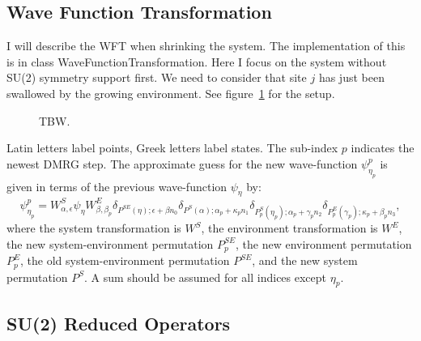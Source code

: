\documentclass[paper=letter]{scrartcl}
\newcommand{\cppClass}[1]{{\sffamily #1}}
\begin{document}
\subsection{Wave Function Transformation}
I will describe the WFT when shrinking the system. The implementation of this is 
in class \cppClass{WaveFunctionTransformation}. Here I focus on the system without SU(2) symmetry support first.
We need to consider that site $j$ has just been swallowed by the growing environment.
See figure~\ref{fig:wft} for the setup. 
\begin{figure}
\caption{TBW.\label{fig:wft}}
\end{figure}
Latin letters label points, Greek letters label states.
The sub-index $p$ indicates the newest DMRG step.
The approximate guess for the new wave-function $\psi^p_{\eta_p}$ is given in terms of the previous 
wave-function $\psi_{\eta}$ by:
\begin{equation}
\psi^p_{\eta_p} = 
W^S_{\alpha,\epsilon}\psi_{\eta}W^E_{\beta,\beta_p}
\delta_{P^{SE}(\eta);\epsilon+\beta n_0}
\delta_{P^S(\alpha);\alpha_{p}+\kappa_{p}n_1}
\delta_{P^S_p(\eta_p);\alpha_p+\gamma_p n_2}
\delta_{P^E_p(\gamma_p);\kappa_p+\beta_p n_3},
\end{equation}
where the system transformation is $W^S$, the environment transformation is $W^E$,
the new system-environment permutation $P^{SE}_p$, the new environment permutation $P^E_p$,
the old system-environment permutation $P^{SE}$, and the new system permutation $P^S$.
A sum should be assumed for all indices except $\eta_p$.
\subsection{SU(2) Reduced Operators}
\end{document}
